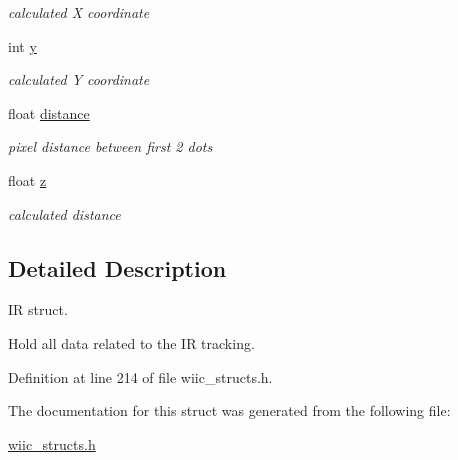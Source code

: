 \begin{DoxyCompactItemize}
\begin{DoxyCompactList}\small\item\em calculated \-X coordinate \end{DoxyCompactList}\item 
\hypertarget{structir__t_aecf2c4663aab868d326caeb7ffd01229}{int \hyperlink{structir__t_aecf2c4663aab868d326caeb7ffd01229}{y}}\label{structir__t_aecf2c4663aab868d326caeb7ffd01229}

\begin{DoxyCompactList}\small\item\em calculated \-Y coordinate \end{DoxyCompactList}\item 
\hypertarget{structir__t_ae964cb719e73986be124cf190d66d44d}{float \hyperlink{structir__t_ae964cb719e73986be124cf190d66d44d}{distance}}\label{structir__t_ae964cb719e73986be124cf190d66d44d}

\begin{DoxyCompactList}\small\item\em pixel distance between first 2 dots \end{DoxyCompactList}\item 
\hypertarget{structir__t_a94c67dc38b051479b8d786449449c864}{float \hyperlink{structir__t_a94c67dc38b051479b8d786449449c864}{z}}\label{structir__t_a94c67dc38b051479b8d786449449c864}

\begin{DoxyCompactList}\small\item\em calculated distance \end{DoxyCompactList}\end{DoxyCompactItemize}


\subsection{\-Detailed \-Description}
\-I\-R struct. 

\-Hold all data related to the \-I\-R tracking. 

\-Definition at line 214 of file wiic\-\_\-structs.\-h.



\-The documentation for this struct was generated from the following file\-:\begin{DoxyCompactItemize}
\item 
\hyperlink{wiic__structs_8h}{wiic\-\_\-structs.\-h}\end{DoxyCompactItemize}
